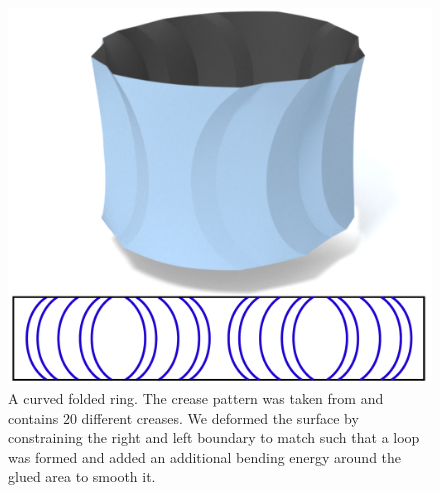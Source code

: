 \begin{figure} [h]
	\centering
	\includegraphics[width=\linewidth]{figures/ring}
	\caption{A curved folded ring. The crease pattern was taken from \cite{mitani2019curved} and contains $20$ different creases. We deformed the surface by constraining the right and left boundary to match such that a loop was formed and added an additional bending energy around the glued area to smooth it.}
	\label{fig:ring}
\end{figure}
